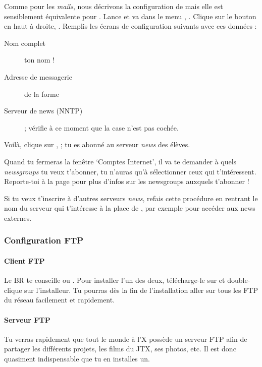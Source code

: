 Comme pour les \emph{mails}, nous décrivons la configuration de  mais elle est sensiblement équivalente pour . Lance
 et va dans le menu , . Clique sur le bouton  en haut à droite,
. Remplis les écrans de configuration suivants avec ces données :
\begin{description}
  \item[Nom complet] ton nom !
  \item[Adresse de messagerie] de la forme 
  \item[Serveur de news (NNTP)] \fkz ; vérifie à ce moment que la case
        n'est pas cochée.
\end{description}
Voilà, clique sur , ; tu es abonné
au serveur \emph{news} des élèves.

Quand tu fermeras la fenêtre `Comptes Internet', il va te demander à
quels \emph{newsgroups} tu veux t'abonner, tu n'auras qu'à sélectionner
ceux qui t'intéressent. Reporte-toi à la page \pageref{newsgroups}
pour plus d'infos sur les newsgroups auxquels t'abonner !

Si tu veux t'inscrire à d'autres serveurs \emph{news}, refais cette
procédure en rentrant le nom du serveur qui t'intéresse à la place
de \fkz, par exemple  pour accéder aux news externes.

\subsubsection{Configuration FTP}

\paragraph{Client FTP}
Le BR te conseille  ou . Pour installer l'un des deux, télécharge-le sur \xshare et double-clique sur l'installeur.
Tu pourras dès la fin de l'installation aller sur tous les FTP du réseau
facilement et rapidement.

\paragraph{Serveur FTP}
Tu verras rapidement que tout le monde à l'X possède un serveur FTP
afin de partager les différents projets, les films du JTX, ses
photos, etc. Il est donc quasiment indispensable que tu en installes
un.

